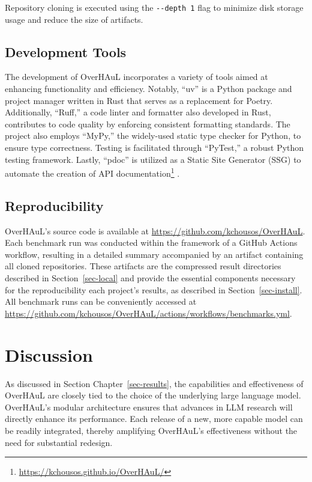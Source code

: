 \documentclass[
  a4paper,
]{scrreprt}
\theoremstyle{definition}
\theoremstyle{remark}
\begin{document}
Repository cloning is executed using the \texttt{-\/-depth\ 1} flag to
minimize disk storage usage and reduce the size of artifacts.

\section{Development Tools}\label{development-tools}

The development of OverHAuL incorporates a variety of tools aimed at
enhancing functionality and efficiency. Notably, ``uv'' is a Python
package and project manager written in Rust that serves as a replacement
for Poetry. Additionally, ``Ruff,'' a code linter and formatter also
developed in Rust, contributes to code quality by enforcing consistent
formatting standards. The project also employs ``MyPy,'' the widely-used
static type checker for Python, to ensure type correctness. Testing is
facilitated through ``PyTest,'' a robust Python testing framework.
Lastly, ``pdoc'' is utilized as a Static Site Generator (SSG) to
automate the creation of API documentation\footnote{\url{https://kchousos.github.io/OverHAuL/}}
\autocite{astral2025,astral2025a,cortesi2025,pytestdevteam2025,pythonsoftwarefoundation2025}.

\section{Reproducibility}\label{reproducibility}

OverHAuL's source code is available at
\url{https://github.com/kchousos/OverHAuL}. Each benchmark run was
conducted within the framework of a GitHub Actions workflow, resulting
in a detailed summary accompanied by an artifact containing all cloned
repositories. These artifacts are the compressed result directories
described in Section~\ref{sec-local} and provide the essential
components necessary for the reproducibility each project's results, as
described in Section~\ref{sec-install}. All benchmark runs can be
conveniently accessed at
\url{https://github.com/kchousos/OverHAuL/actions/workflows/benchmarks.yml}.


\chapter{Discussion}\label{discussion}

As discussed in Section Chapter~\ref{sec-results}, the capabilities and
effectiveness of OverHAuL are closely tied to the choice of the
underlying large language model. OverHAuL's modular architecture ensures
that advances in LLM research will directly enhance its performance.
Each release of a new, more capable model can be readily integrated,
thereby amplifying OverHAuL's effectiveness without the need for
substantial redesign.
\end{document}
